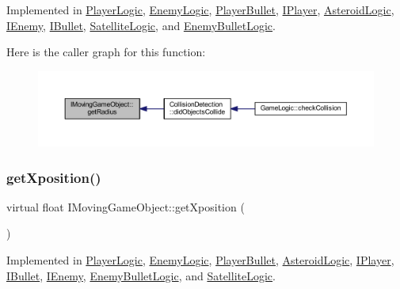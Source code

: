 Implemented in \hyperlink{class_player_logic_a2ca2c54d1e07bfc40a08b5c55403af3a}{Player\+Logic}, \hyperlink{class_enemy_logic_ab6736c870e69bc20bef8d6d010946eb2}{Enemy\+Logic}, \hyperlink{class_player_bullet_a1ff56e38b1447500d2887b6fe1eeb674}{Player\+Bullet}, \hyperlink{class_i_player_a240460b3baeee74029f1fc407493d121}{I\+Player}, \hyperlink{class_asteroid_logic_a575d9f801770906960b65dafe937fba5}{Asteroid\+Logic}, \hyperlink{class_i_enemy_ab1fb8f6320916ef6a1497f9651704d05}{I\+Enemy}, \hyperlink{class_i_bullet_a327968e71126cdea5998076d8919354f}{I\+Bullet}, \hyperlink{class_satellite_logic_a5b86efe041f1d537ec83b9f7dd574b7e}{Satellite\+Logic}, and \hyperlink{class_enemy_bullet_logic_a7e473b13bf07fdf8eb76b65e02879bf7}{Enemy\+Bullet\+Logic}.

Here is the caller graph for this function\+:\nopagebreak
\begin{figure}[H]
\begin{center}
\leavevmode
\includegraphics[width=350pt]{class_i_moving_game_object_ab2120f126d088beda46654aa3ccfd705_icgraph}
\end{center}
\end{figure}
\mbox{\label{class_i_moving_game_object_acc7f0195491b1843558c8c558cbc7363}} 
\subsubsection{\texorpdfstring{get\+Xposition()}{getXposition()}}
{\footnotesize\ttfamily virtual float I\+Moving\+Game\+Object\+::get\+Xposition (\begin{DoxyParamCaption}{ }\end{DoxyParamCaption})\hspace{0.3cm}{\ttfamily [pure virtual]}}



Implemented in \hyperlink{class_player_logic_a9f92defe2d43690329bd6e334fb61e01}{Player\+Logic}, \hyperlink{class_enemy_logic_a7eed969ab8e3d2527cdac04ef39a5aba}{Enemy\+Logic}, \hyperlink{class_player_bullet_aa9462c44892190316ee479a18693b6ad}{Player\+Bullet}, \hyperlink{class_asteroid_logic_a1d79a614c5e1a9409404f6a2def25761}{Asteroid\+Logic}, \hyperlink{class_i_player_a9df96a1fd43f35f2579e2ec4a167acfe}{I\+Player}, \hyperlink{class_i_bullet_a20babdd6c657ddda175e84a56564dcfa}{I\+Bullet}, \hyperlink{class_i_enemy_a504ea7fa77b8984d5b9dd71352876943}{I\+Enemy}, \hyperlink{class_enemy_bullet_logic_afe73016d27c33171a20c15e11026106e}{Enemy\+Bullet\+Logic}, and \hyperlink{class_satellite_logic_a3a35c4c5b5ff051dbfcffc7ce85e40a2}{Satellite\+Logic}.

